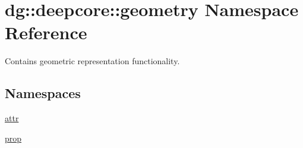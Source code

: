 \hypertarget{namespacedg_1_1deepcore_1_1geometry}{}\section{dg\+:\+:deepcore\+:\+:geometry Namespace Reference}
\label{namespacedg_1_1deepcore_1_1geometry}


Contains geometric representation functionality.  


\subsection*{Namespaces}
\begin{DoxyCompactItemize}
\item 
 \hyperlink{namespacedg_1_1deepcore_1_1geometry_1_1attr}{attr}
\item 
 \hyperlink{namespacedg_1_1deepcore_1_1geometry_1_1prop}{prop}
\end{DoxyCompactItemize}
